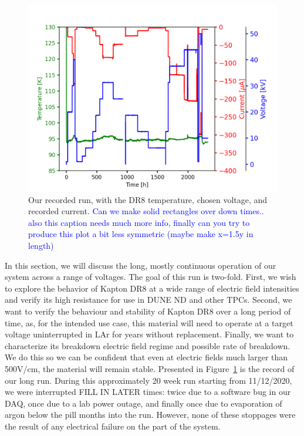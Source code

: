 \documentclass[a4paper,12pt]{article}
\newcommand{\RI}[1]{\textcolor{blue}{#1}}
\begin{document}
\begin{figure}[htb]
	\centerline{\includegraphics[width=\linewidth]{longrun.png}}
	
	\caption{Our recorded run, with the DR8 temperature, chosen voltage, and recorded current. \RI{Can we make solid rectangles over down times.. also this caption needs much more info, finally can you try to produce this plot a bit less symmetric (maybe make x=1.5y in length)} }
	\label{fig:stab}
\end{figure}
In this section, we will discuss the long, mostly continuous operation of our system across a range of voltages. The goal of this run is two-fold. First, we wish to explore the behavior of Kapton DR8 at a wide range of electric field intensities and verify its high resistance for use in DUNE ND and other TPCs. Second, we want to verify the behaviour and stability of Kapton DR8 over a long period of time, as, for the intended use case, this material will need to operate at a target voltage uninterrupted in LAr for years without replacement. Finally, we want to characterize its breakdown electric field regime and possible rate of breakdown. We do this so we can be confident that even at electric fields much larger than 500V/cm, the material will remain stable. Presented in Figure~\ref{fig:stab} is the record of our long run. During this approximately 20 week run starting from 11/12/2020, we were interrupted FILL IN LATER times: twice due to a software bug in our DAQ, once due to a lab power outage, and finally once due to evaporation of argon below the pill months into the run. However, none of these stoppages were the result of any electrical failure on the part of the system.
\end{document}
